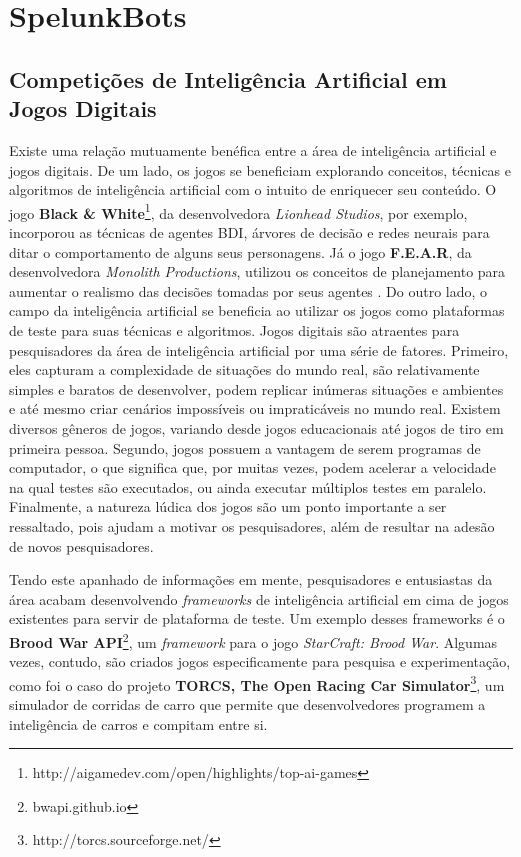 \chapter{\label{chap:spelunkbots}SpelunkBots}

\section{\label{section:game-ai-competitions}Competições de Inteligência
Artificial em Jogos Digitais}
Existe uma relação mutuamente benéfica entre a área de inteligência artificial
e jogos digitais.  De um lado, os jogos se beneficiam explorando conceitos,
técnicas e algoritmos de inteligência artificial com o intuito de enriquecer
seu conteúdo. O jogo \textbf{Black \&
White}\footnote{http://aigamedev.com/open/highlights/top-ai-games}, da
desenvolvedora \textit{Lionhead Studios}, por exemplo, incorporou as técnicas
de agentes BDI, árvores de decisão e redes neurais para ditar o comportamento
de alguns seus personagens.  Já o jogo \textbf{F.E.A.R}, da desenvolvedora
\textit{Monolith Productions}, utilizou os conceitos de planejamento para
aumentar o realismo das decisões tomadas por seus agentes \cite{FEARPLANNING}.
Do outro lado, o campo da inteligência artificial se beneficia ao utilizar os
jogos como plataformas de teste para suas técnicas e algoritmos. Jogos digitais
são atraentes para pesquisadores da área de inteligência artificial por uma
série de fatores. Primeiro, eles capturam a complexidade de situações do mundo
real, são relativamente simples e baratos de desenvolver, podem replicar
inúmeras situações e ambientes e até mesmo criar cenários impossíveis ou
impraticáveis no mundo real. Existem diversos gêneros de jogos, variando desde
jogos educacionais até jogos de tiro em primeira pessoa. Segundo, jogos possuem
a vantagem de serem programas de computador, o que significa que, por muitas
vezes, podem acelerar a velocidade na qual testes são executados, ou ainda
executar múltiplos testes em paralelo. Finalmente, a natureza lúdica dos jogos
são um ponto importante a ser ressaltado, pois ajudam a motivar os
pesquisadores, além de resultar na adesão de novos pesquisadores.

Tendo este apanhado de informações em mente, pesquisadores e entusiastas da
área acabam desenvolvendo \textit{frameworks} de inteligência artificial em
cima de jogos existentes para servir de plataforma de teste. Um exemplo desses
frameworks é o \textbf{Brood War API}\footnote{bwapi.github.io}, um
\textit{framework} para o jogo \textit{StarCraft: Brood War}. Algumas vezes,
contudo, são criados jogos especificamente para pesquisa e experimentação, como
foi o caso do projeto \textbf{TORCS, The Open Racing Car
Simulator}\footnote{http://torcs.sourceforge.net/}, um simulador de corridas de
carro que permite que desenvolvedores programem a inteligência de carros e
compitam entre si.

